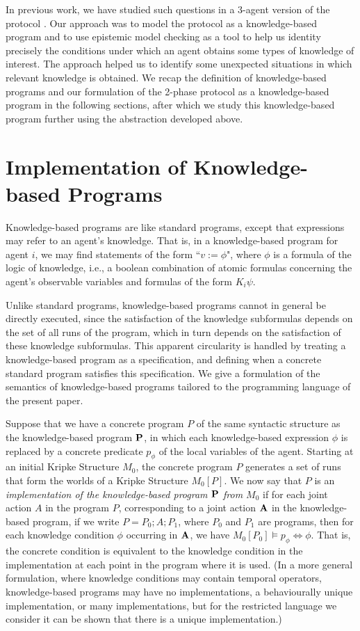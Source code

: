 \documentclass[]{llncs}
\newcommand{\dimp}{\Leftrightarrow}
\begin{document}
In previous work, we have studied such questions in a 
3-agent version of the protocol \cite{AlBatainehMeyden10}. 
Our approach was to model the protocol as a knowledge-based program 
and to use epistemic model checking as a tool to help us identity precisely 
the conditions under which an agent obtains some types of knowledge of interest. 
The approach helped us to identify some unexpected situations in which 
relevant knowledge is obtained. 
We recap the definition of knowledge-based programs and our
formulation of the 2-phase protocol as a knowledge-based program 
in the following sections, after which we study this knowledge-based program 
further using the abstraction developed above. 

\section{Implementation of Knowledge-based Programs} \label{sec:kbp} 

Knowledge-based programs \cite{FHMVbook} are like standard programs, except that 
expressions may refer to an agent's knowledge. 
That is, in a knowledge-based 
program for agent $i$, we may find 
statements 
 of the form
 ``$v:= \phi$", 
where $\phi$ is a formula of the logic of knowledge, i.e., 
a boolean combination of atomic formulas concerning the agent's observable variables
and formulas of the form $K_i\psi$.

Unlike standard programs, knowledge-based programs cannot in general be directly executed,
since the satisfaction of the knowledge subformulas depends on the
set of all runs of the program,  which
in turn depends on the satisfaction of these knowledge subformulas. 
This apparent circularity is handled by treating a knowledge-based program as a  specification, and 
defining when a concrete standard program satisfies this specification. 
We give a formulation of the semantics of knowledge-based programs tailored to the 
programming language of the present paper. 


Suppose that we have a concrete program $P$ of the same syntactic structure as the knowledge-based program ${\bf P}$, 
in which each knowledge-based expression 
$\phi$ is replaced by a concrete predicate $p_\phi$ of the local variables of the agent. 
Starting at an initial Kripke Structure $M_0$, 
the concrete program $P$ generates a set of runs that form the worlds of a
Kripke Structure $M_0[P]$. 
We now say that $P$ is an {\em implementation of the knowledge-based program ${\bf P}$ from $M_0$}  if
for each joint action $A$ in the program $P$, corresponding to a joint action ${\bf A}$ in the 
knowledge-based program,  if we write $P = P_0;A;P_1$, where 
$P_0$ and $P_1$ are programs, then for each knowledge condition  $\phi$ occurring in ${\bf A}$, 
we have  $M_0[P_0]\models p_\phi \dimp \phi$.
That is, the concrete condition is equivalent to the knowledge condition in the implementation
at each point in the program where it is used. 
(In a more general formulation, where knowledge conditions may contain temporal operators,  
knowledge-based programs may have no implementations, a behaviourally unique implementation, or
many implementations, but for the restricted language we consider it can be shown that there is a unique implementation.) 
\end{document}
